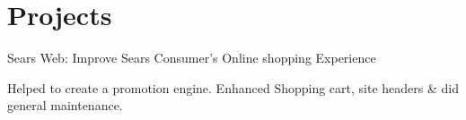 \documentclass[]{de-resume}
\begin{document}
\begin{minipage}[t]{0.66\textwidth}
\section{Projects}
  
\subsectionsep
 \subsectionsep
 \begin{tightemize}
 \item Sears Web: Improve Sears Consumer's Online shopping Experience
 	\begin{tightemize}
 		\sectionsep
 		\item Helped to create a promotion engine. Enhanced Shopping cart, site headers \& did general maintenance.
 		\sectionsep
 	\end{tightemize}
 \end{tightemize}
 \end{minipage} 
\end{document}
